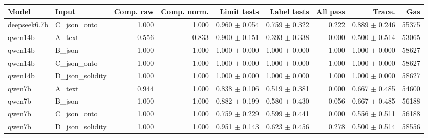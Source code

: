 \begin{tabular}{llrrrrrrr}
\toprule
Model & Input & Comp. raw & Comp. norm. & Limit tests & Label tests & All pass & Trace. & Gas \\
\midrule
deepseek6.7b & C\_json\_onto & 1.000 & 1.000 & 0.960 $\pm$ 0.054 & 0.759 $\pm$ 0.322 & 0.222 & 0.889 $\pm$ 0.246 & 55375 \\
qwen14b & A\_text & 0.556 & 0.833 & 0.900 $\pm$ 0.151 & 0.393 $\pm$ 0.338 & 0.000 & 0.500 $\pm$ 0.514 & 53065 \\
qwen14b & B\_json & 1.000 & 1.000 & 1.000 $\pm$ 0.000 & 1.000 $\pm$ 0.000 & 1.000 & 1.000 $\pm$ 0.000 & 58627 \\
qwen14b & C\_json\_onto & 1.000 & 1.000 & 1.000 $\pm$ 0.000 & 1.000 $\pm$ 0.000 & 1.000 & 1.000 $\pm$ 0.000 & 58627 \\
qwen14b & D\_json\_solidity & 1.000 & 1.000 & 1.000 $\pm$ 0.000 & 1.000 $\pm$ 0.000 & 1.000 & 1.000 $\pm$ 0.000 & 58627 \\
qwen7b & A\_text & 0.944 & 1.000 & 0.838 $\pm$ 0.106 & 0.519 $\pm$ 0.381 & 0.000 & 0.667 $\pm$ 0.485 & 54600 \\
qwen7b & B\_json & 1.000 & 1.000 & 0.882 $\pm$ 0.199 & 0.580 $\pm$ 0.430 & 0.056 & 0.667 $\pm$ 0.485 & 56188 \\
qwen7b & C\_json\_onto & 1.000 & 1.000 & 0.759 $\pm$ 0.229 & 0.599 $\pm$ 0.441 & 0.000 & 0.556 $\pm$ 0.511 & 56188 \\
qwen7b & D\_json\_solidity & 1.000 & 1.000 & 0.951 $\pm$ 0.143 & 0.623 $\pm$ 0.456 & 0.278 & 0.500 $\pm$ 0.514 & 58556 \\
\bottomrule
\end{tabular}
